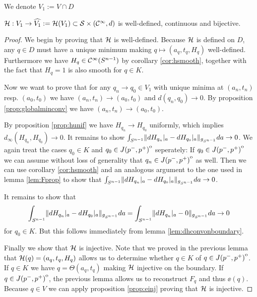 We denote $V_1:=V\cap D$
\begin{lemma}
    ${\mathcal{H}}:V_1\to \widehat{V_1}:={\mathcal{H}}(V_1)\subset {\mathcal{S}}\times({\mathcal{C}}^\infty, d)$ is well-defined, continuous and bijective.
\end{lemma}
\begin{proof}
    We begin by proving that ${\mathcal{H}}$ is well-defined. Because ${\mathcal{H}}$ is defined on $D$, any $q\in D$ must have a unique minimum making $q\mapsto(a_q,t_q,H_q)$ well-defined. Furthermore we have $H_q\in {\mathcal{C}}^\infty({S^{n-1}})$ by corollary \ref{cor:hsmooth}, together with the fact that $H_q=1$ is also smooth for $q\in K$.

    Now we want to prove that for any $q_n\to q_0\in V_1$ with unique minima at $(a_n,t_n)$ resp. $(a_0,t_0)$ we have $(a_n,t_n) \to (a_0,t_0)$ and $d(q_n,q_0)\to 0$. By proposition \ref{prop:globalminconv} we have $(a_n,t_n) \to (a_0,t_0)$.
    
    By proposition \ref{prop:hunif} we have $H_{q_n}\to H_{q_0}$ uniformly, which implies $d_\infty(H_{q_n},H_{q_0})\to 0$. It remains to show $\int_{{S^{n-1}}} \lVert dH_{q_n}\rvert_a - dH_{q_0}\rvert_a \rVert_{g_{S^{n-1}}}da \to 0$. We again treat the cases $q_0\in K$ and $q_0\in {\kern0ptJ(p^-,p^+)}^{\mathrm{o}}$ seperately: If $q_0\in {\kern0ptJ(p^-,p^+)}^{\mathrm{o}}$ we can assume without loss of generality that $q_n\in {\kern0ptJ(p^-,p^+)}^{\mathrm{o}}$ as well. Then we can use corollary \ref{cor:hsmooth} and an analogous argument to the one used in lemma \ref{lem:Fprop} to show that $\int_{{S^{n-1}}} \lVert dH_{q_n}\rvert_a - dH_{q_0}\rvert_a \rVert_{g_{S^{n-1}}}da \to 0$.

    It remains to show that 
    \[
        \int_{{S^{n-1}}} \lVert dH_{q_n}\rvert_a - dH_{q_0}\rvert_a \rVert_{g_{S^{n-1}}}da = \int_{{S^{n-1}}} \lVert dH_{q_n}\rvert_a - 0\rVert_{g_{S^{n-1}}}da \to 0
    \] for $q_0\in K$. But this follows immediately from lemma \ref{lem:dhconvonboundary}.

    Finally we show that ${\mathcal{H}}$ is injective. Note that we proved in the previous lemma that ${\mathcal{H}}(q)=(a_q,t_q,H_q)$ allows us to determine whether $q\in K$ of $q\in {\kern0ptJ(p^-,p^+)}^{\mathrm{o}}$.
    If $q\in K$ we have $q = \Theta(a_q,t_q)$ making ${\mathcal{H}}$ injective on the boundary. If $q\in {\kern0ptJ(p^-,p^+)}^{\mathrm{o}}$, the previous lemma allows us to reconstruct $F_q$ and thus $\ee(q)$. Because $q\in V$ we can apply proposition \ref{prop:einj} proving that ${\mathcal{H}}$ is injective.
\end{proof}

